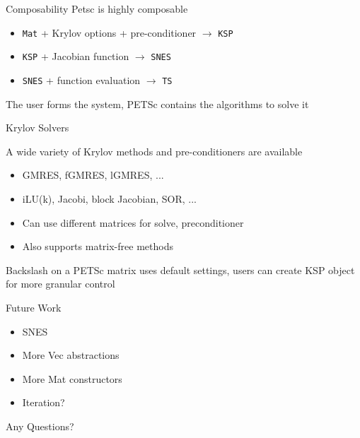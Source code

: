 \documentclass{beamer}
\begin{document}
\begin{frame}{Composability}
Petsc is highly composable
\begin{itemize}
  \item \texttt{Mat} + Krylov options + pre-conditioner $\rightarrow$ \texttt{KSP}
  \item \texttt{KSP} + Jacobian function $\rightarrow$ \texttt{SNES}
  \item \texttt{SNES} + function evaluation $\rightarrow$ \texttt{TS}
\end{itemize}
\hfill

The user forms the system, PETSc contains the algorithms to solve it
\end{frame}



\begin{frame}{Krylov Solvers}
\hfill

A wide variety of Krylov methods and pre-conditioners are available
\begin{itemize}
  \item GMRES, fGMRES, lGMRES, ...
  \item iLU(k), Jacobi, block Jacobian, SOR, ...
  \item Can use different matrices for solve, preconditioner
  \item Also supports matrix-free methods
\end{itemize}
\hfill

Backslash on a PETSc matrix uses default settings, users can create KSP object for more granular control
\end{frame}

\begin{frame}{Future Work}
  \begin{itemize}
    \item SNES
    \item More Vec abstractions
    \item More Mat constructors
    \item Iteration?
  \end{itemize}
\end{frame}

\begin{frame}
\begin{center}  
Any Questions?
\end{center}

\end{frame}
\end{document}
